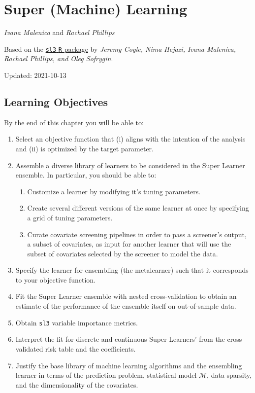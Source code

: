 \documentclass[
  12pt, krantz2,
]{book}
\newcommand{\passthrough}[1]{#1}
\providecommand{\tightlist}{%
  \setlength{\itemsep}{0pt}\setlength{\parskip}{0pt}}
\theoremstyle{definition}
\theoremstyle{definition}
\theoremstyle{definition}
\newcommand{\M}{\mathcal{M}}
\newcommand{\1}{\mathbbm{1}}
\begin{document}
\hypertarget{sl3}{%
\chapter{Super (Machine) Learning}\label{sl3}}

\emph{Ivana Malenica} and \emph{Rachael Phillips}

Based on the \href{https://github.com/tlverse/sl3}{\passthrough{\lstinline!sl3!} \passthrough{\lstinline!R!} package} by \emph{Jeremy
Coyle, Nima Hejazi, Ivana Malenica, Rachael Phillips, and Oleg Sofrygin}.

Updated: 2021-10-13

\hypertarget{learning-objectives-2}{%
\section*{Learning Objectives}\label{learning-objectives-2}}


By the end of this chapter you will be able to:

\begin{enumerate}
\def\labelenumi{\arabic{enumi}.}
\item
  Select an objective function that (i) aligns with the intention of the
  analysis and (ii) is optimized by the target parameter.
\item
  Assemble a diverse library of learners to be considered in the Super Learner
  ensemble. In particular, you should be able to:

  \begin{enumerate}
  \def\labelenumii{\alph{enumii}.}
  \tightlist
  \item
    Customize a learner by modifying it's tuning parameters.
  \item
    Create several different versions of the same learner at once by
    specifying a grid of tuning parameters.
  \item
    Curate covariate screening pipelines in order to pass a screener's
    output, a subset of covariates, as input for another learner that will
    use the subset of covariates selected by the screener to model the data.
  \end{enumerate}
\item
  Specify the learner for ensembling (the metalearner) such that it corresponds
  to your objective function.
\item
  Fit the Super Learner ensemble with nested cross-validation to obtain an
  estimate of the performance of the ensemble itself on out-of-sample data.
\item
  Obtain \passthrough{\lstinline!sl3!} variable importance metrics.
\item
  Interpret the fit for discrete and continuous Super Learners' from the
  cross-validated risk table and the coefficients.
\item
  Justify the base library of machine learning algorithms and the ensembling
  learner in terms of the prediction problem, statistical model \(\M\), data
  sparsity, and the dimensionality of the covariates.
\end{enumerate}
\end{document}
